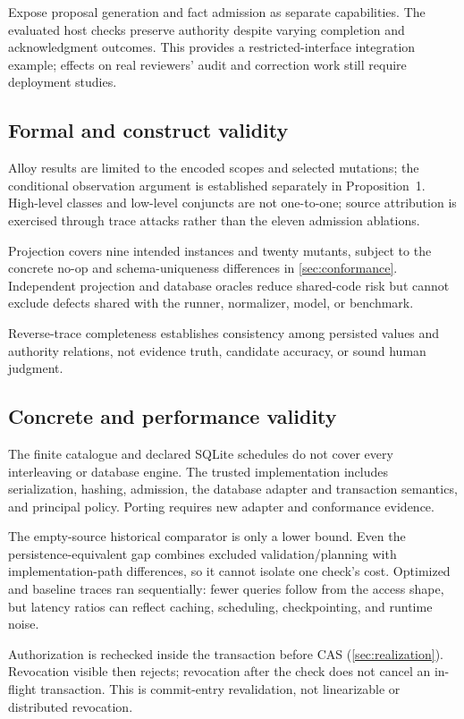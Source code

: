 Expose proposal generation and fact admission as separate capabilities. The evaluated host checks preserve authority despite varying completion and acknowledgment outcomes. This provides a restricted-interface integration example; effects on real reviewers' audit and correction work still require deployment studies.

\subsection{Formal and construct validity}

Alloy results are limited to the encoded scopes and selected mutations; the conditional observation argument is established separately in Proposition~1. High-level classes and low-level conjuncts are not one-to-one; source attribution is exercised through trace attacks rather than the eleven admission ablations.

Projection covers nine intended instances and twenty mutants, subject to the concrete no-op and schema-uniqueness differences in \cref{sec:conformance}. Independent projection and database oracles reduce shared-code risk but cannot exclude defects shared with the runner, normalizer, model, or benchmark.

Reverse-trace completeness establishes consistency among persisted values and authority relations, not evidence truth, candidate accuracy, or sound human judgment. 

\subsection{Concrete and performance validity}

The finite catalogue and declared SQLite schedules do not cover every interleaving or database engine. The trusted implementation includes serialization, hashing, admission, the database adapter and transaction semantics, and principal policy. Porting requires new adapter and conformance evidence.

The empty-source historical comparator is only a lower bound. Even the persistence-equivalent gap combines excluded validation/planning with implementation-path differences, so it cannot isolate one check's cost. Optimized and baseline traces ran sequentially: fewer queries follow from the access shape, but latency ratios can reflect caching, scheduling, checkpointing, and runtime noise.

Authorization is rechecked inside the transaction before CAS (\cref{sec:realization}). Revocation visible then rejects; revocation after the check does not cancel an in-flight transaction. This is commit-entry revalidation, not linearizable or distributed revocation.

